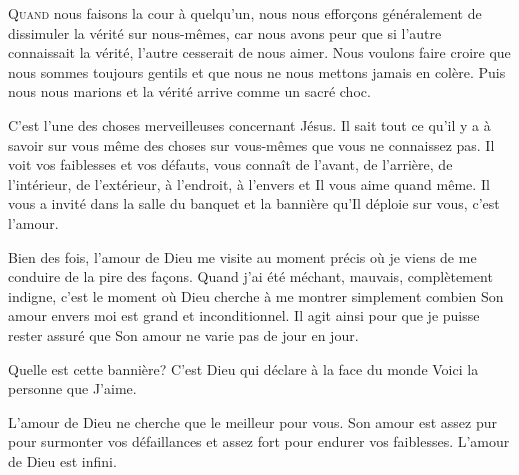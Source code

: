 \lettrine{Q}{uand} nous faisons la cour à quelqu'un,
 nous nous effor\c{c}ons généralement de dissimuler la vérité sur nous-mêmes,
 car nous avons peur que si l'autre connaissait la vérité,
 l'autre cesserait de nous aimer.
 Nous voulons faire croire que nous sommes toujours gentils
 et que nous ne nous mettons jamais en colère.
 Puis nous nous marions et la vérité arrive comme un sacré choc. 

C'est l'une des choses merveilleuses concernant Jésus.
 Il sait tout ce qu'il y a à savoir sur vous
 \ocadr même des choses sur vous-mêmes que vous ne connaissez pas.
 Il voit vos faiblesses et vos défauts, vous connaît de l'avant,
 de l'arrière, de l'intérieur, de l'extérieur, à l'endroit,
 à l'envers et Il vous aime quand même.
 Il vous a invité dans la salle du banquet et la bannière
 qu'Il déploie sur vous, c'est l'amour.

Bien des fois, l'amour de Dieu me visite au moment précis
 où je viens de me conduire de la pire des fa\c{c}ons.
 Quand j'ai été méchant, mauvais, complètement indigne,
 c'est le moment où Dieu cherche à me montrer simplement
 combien Son amour envers moi est grand et inconditionnel.
 Il agit ainsi pour que je puisse rester assuré que Son amour
 ne varie pas de jour en jour. 

Quelle est cette bannière?
 C'est Dieu qui déclare à la face du monde\frcolon{} 
 \Og Voici la personne que J'aime. \Fg{}



L'amour de Dieu ne cherche que le meilleur pour vous.
 Son amour est assez pur pour surmonter vos défaillances
 et assez fort pour endurer vos faiblesses.
 L'amour de Dieu est infini. 

\dvrule






